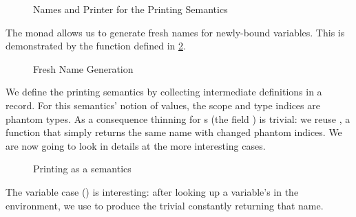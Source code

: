 \begin{figure}[h]
\begin{minipage}[t]{0.6\textwidth}
\end{minipage}
\begin{minipage}[t]{0.4\textwidth}
\end{minipage}

\begin{minipage}[t]{0.5\textwidth}
\end{minipage}
\begin{minipage}[t]{0.5\textwidth}
\end{minipage}
\caption{Names and Printer for the Printing Semantics\label{fig:semprint}}
\end{figure}

The monad  allows us to generate fresh names for newly-bound
variables. This is demonstrated by the function  defined in
\cref{fig:freshname}.

\begin{figure}[h]
\caption{Fresh Name Generation\label{fig:freshname}}
\end{figure}

We define the printing semantics by collecting intermediate definitions in
a record. For this semantics' notion of values, the scope and type indices
are phantom types. As a consequence thinning for s (the field
) is trivial: we reuse ,
a function that simply returns the same name with changed phantom indices.
We are now going to look in details at the more interesting cases.

\begin{figure}[h]
  \caption{Printing as a semantics}
\end{figure}

%
The variable case () is interesting: after looking up a
variable's  in the environment, we use  to produce the
trivial  constantly returning that name.


